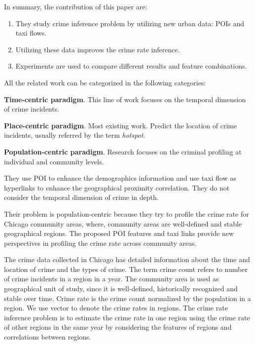 \documentclass[10pt,letterpaper,english]{article}
\begin{document}
In summary, the contribution of this paper are: 
\begin{enumerate}

\item They study crime inference problem by utilizing new urban data: POIs and taxi flows. 

\item  Utilizing these data improves the crime rate inference. 

\item Experiments are used to compare different results and feature combinations. 
\end{enumerate}
All the related work can be categorized in the following categories:
\begin{description}
\item \textbf{Time-centric paradigm}. This line of work focuses on the temporal dimension of crime incidents.

\item \textbf{Place-centric paradigm}. Most existing work. Predict the location of crime incidents, usually referred by the term \textit{hotspot}.

\item \textbf{Population-centric paradigm}. Research focuses on the criminal profiling at individual and community levels.

\end{description}

They use POI to enhance the demographics information and use taxi flow as hyperlinks to enhance the geographical proximity correlation.  They do not consider the temporal dimension of crime in depth.

Their problem is population-centric because they try to profile the crime rate for Chicago community areas, where, community areas are well-defined and stable geographical regions.  The proposed POI features and taxi links provide new perspectives in profiling the crime rate across community areas.

The crime data collected in Chicago has detailed information about the time and location of crime and the types of crime. The term crime count refers to number of crime incidents in a region in a year. The community area is used as geographical unit of study, since it is well-defined, historically recognized and stable over time. Crime rate is the crime count normalized by the population in a region. We use vector  to denote the crime rates in regions. The crime rate inference problem is to estimate the crime rate in one region using the crime rate of other regions in the same year by considering the features of regions and correlations between regions.
\end{document}
